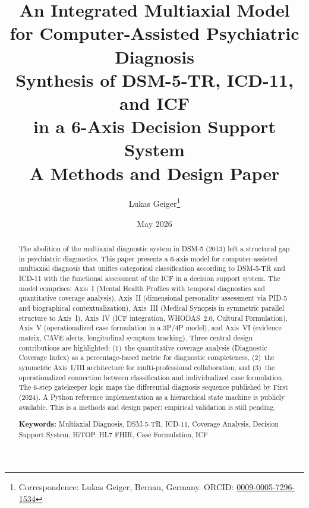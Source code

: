 \documentclass[11pt,a4paper]{article}
\begin{document}
\title{\textbf{\huge An Integrated Multiaxial Model\\for Computer-Assisted Psychiatric Diagnosis}\\[0.5em]
\Large Synthesis of DSM-5-TR, ICD-11, and ICF\\in a 6-Axis Decision Support System\\[0.3em]
\large A Methods and Design Paper}

\author[1]{Lukas Geiger\thanks{Correspondence: Lukas Geiger, Bernau, Germany. ORCID: \href{https://orcid.org/0009-0005-7296-1534}{0009-0005-7296-1534}}}

\date{May 2026}

\maketitle

\begin{abstract}
\noindent The abolition of the multiaxial diagnostic system in DSM-5 (2013) left a structural gap in psychiatric diagnostics. This paper presents a 6-axis model for computer-assisted multiaxial diagnosis that unifies categorical classification according to DSM-5-TR and ICD-11 with the functional assessment of the ICF in a decision support system. The model comprises: Axis~I (Mental Health Profiles with temporal diagnostics and quantitative coverage analysis), Axis~II (dimensional personality assessment via PID-5 and biographical contextualization), Axis~III (Medical Synopsis in symmetric parallel structure to Axis~I), Axis~IV (ICF integration, WHODAS~2.0, Cultural Formulation), Axis~V (operationalized case formulation in a 3P/4P model), and Axis~VI (evidence matrix, CAVE alerts, longitudinal symptom tracking). Three central design contributions are highlighted: (1)~the quantitative coverage analysis (Diagnostic Coverage Index) as a percentage-based metric for diagnostic completeness, (2)~the symmetric Axis~I/III architecture for multi-professional collaboration, and (3)~the operationalized connection between classification and individualized case formulation. The 6-step gatekeeper logic maps the differential diagnosis sequence published by First (2024). A Python reference implementation as a hierarchical state machine is publicly available. This is a methods and design paper; empirical validation is still pending.

\vspace{0.5em}
\noindent \textbf{Keywords:} Multiaxial Diagnosis, DSM-5-TR, ICD-11, Coverage Analysis, Decision Support System, HiTOP, HL7 FHIR, Case Formulation, ICF
\end{abstract}
\end{document}
